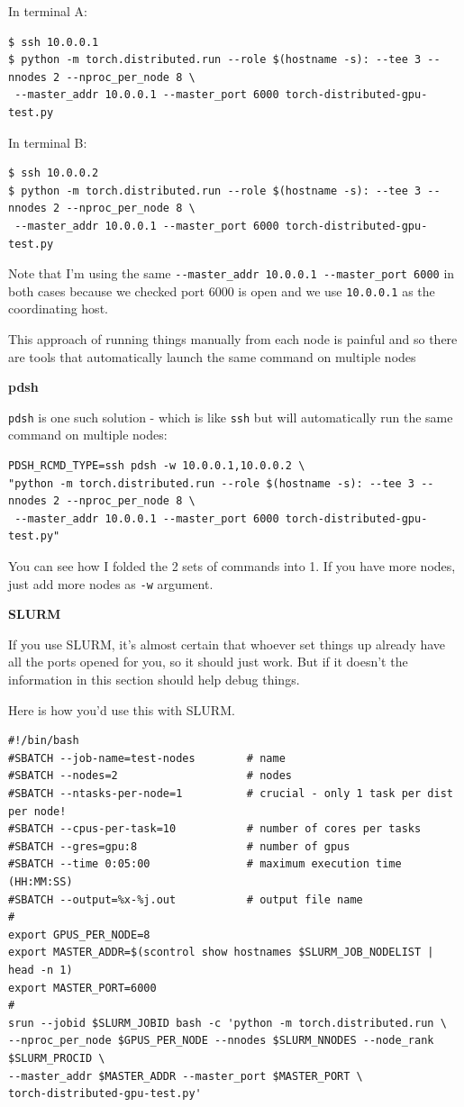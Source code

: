 \documentclass[
]{report}
\begin{document}
In terminal A:

\begin{verbatim}
$ ssh 10.0.0.1
$ python -m torch.distributed.run --role $(hostname -s): --tee 3 --nnodes 2 --nproc_per_node 8 \
 --master_addr 10.0.0.1 --master_port 6000 torch-distributed-gpu-test.py
\end{verbatim}

In terminal B:

\begin{verbatim}
$ ssh 10.0.0.2
$ python -m torch.distributed.run --role $(hostname -s): --tee 3 --nnodes 2 --nproc_per_node 8 \
 --master_addr 10.0.0.1 --master_port 6000 torch-distributed-gpu-test.py
\end{verbatim}

Note that I'm using the same
\texttt{-\/-master\_addr\ 10.0.0.1\ -\/-master\_port\ 6000} in both
cases because we checked port 6000 is open and we use \texttt{10.0.0.1}
as the coordinating host.

This approach of running things manually from each node is painful and
so there are tools that automatically launch the same command on
multiple nodes

\textbf{pdsh}

\texttt{pdsh} is one such solution - which is like \texttt{ssh} but will
automatically run the same command on multiple nodes:

\begin{verbatim}
PDSH_RCMD_TYPE=ssh pdsh -w 10.0.0.1,10.0.0.2 \
"python -m torch.distributed.run --role $(hostname -s): --tee 3 --nnodes 2 --nproc_per_node 8 \
 --master_addr 10.0.0.1 --master_port 6000 torch-distributed-gpu-test.py"
\end{verbatim}

You can see how I folded the 2 sets of commands into 1. If you have more
nodes, just add more nodes as \texttt{-w} argument.

\textbf{SLURM}

If you use SLURM, it's almost certain that whoever set things up already
have all the ports opened for you, so it should just work. But if it
doesn't the information in this section should help debug things.

Here is how you'd use this with SLURM.

\begin{verbatim}
#!/bin/bash
#SBATCH --job-name=test-nodes        # name
#SBATCH --nodes=2                    # nodes
#SBATCH --ntasks-per-node=1          # crucial - only 1 task per dist per node!
#SBATCH --cpus-per-task=10           # number of cores per tasks
#SBATCH --gres=gpu:8                 # number of gpus
#SBATCH --time 0:05:00               # maximum execution time (HH:MM:SS)
#SBATCH --output=%x-%j.out           # output file name
#
export GPUS_PER_NODE=8
export MASTER_ADDR=$(scontrol show hostnames $SLURM_JOB_NODELIST | head -n 1)
export MASTER_PORT=6000
#
srun --jobid $SLURM_JOBID bash -c 'python -m torch.distributed.run \
--nproc_per_node $GPUS_PER_NODE --nnodes $SLURM_NNODES --node_rank $SLURM_PROCID \
--master_addr $MASTER_ADDR --master_port $MASTER_PORT \
torch-distributed-gpu-test.py'
\end{verbatim}
\end{document}
